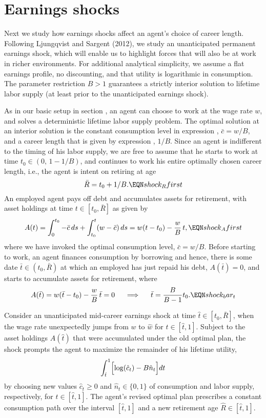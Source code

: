 \section{Earnings shocks}\label{sec:LSshocks}%
Next we study how earnings shocks affect an agent's choice of
career length. Following Ljungqvist and Sargent (2012), we
study an unanticipated permanent earnings shock, which will enable
us to highlight forces that will also be at work in richer
environments. For additional analytical simplicity, we assume a flat
earnings profile, no discounting, and that utility is logarithmic in
consumption. The parameter restriction $B>1$ guarantees a strictly
interior solution to lifetime labor supply (at least prior to
the unanticipated earnings shock).

As in our basic setup in section , an agent can
choose to work at the wage rate $w$, and solves a deterministic
lifetime labor supply problem. The optimal solution at an interior
solution is the constant consumption level in
expression , $\bar c = w / B$, and a career
length that is given by expression , $1 /B$.
Since an agent is indifferent to the timing of his labor supply,
we are free to assume that he starts to work at time
$t_0 \in (0, \,1-1/B)$,
and continues to work his entire optimally chosen
career length, i.e., the agent is intent on retiring at age
$$
\bar R = t_0 + 1/B.                              \EQN shock_Rfirst
$$
An employed agent pays off debt and accumulates assets for retirement,
with asset holdings at time $t \in [t_0, \bar R]$ as given by
$$
A(t) = \int_0^{t_0} - \bar c \, ds +
      \int_{t_0}^t (w - \bar c)\, ds
    = w (t-t_0 ) - {w  \over B} \,t,              \EQN shock_Afirst
$$
where we have invoked the optimal consumption level, $\bar c = w / B$.
Before starting to work, an agent finances consumption by
borrowing and hence, there is some date $\bar t \in (t_0, \bar R)$
at which an employed has just repaid his debt, $A(\bar t)=0$, and
starts to accumulate assets for retirement, where
$$
A(\bar t) = w (\bar t-t_0 ) - {w  \over B} \,\bar t = 0
\hskip.5cm \Longrightarrow \hskip.5cm \bar t = {B \over B-1} t_0.
                                                 \EQN shock_bar_t
$$

Consider an unanticipated mid-career earnings shock at time
$\hat t \in[t_0, \bar R]$, when the wage rate unexpectedly
jumps from $w$ to $\hat w$ for $t\in [\hat t, 1]$. Subject to
the asset holdings $A(\hat t)$ that were accumulated under the
old optimal plan, the shock prompts the agent to maximize the
remainder of his lifetime utility,
$$
\int_{\hat t}^1 \Bigl[ \log (\hat c_t) - B \hat n_t \Bigr] dt
$$
by choosing new values $\hat c_t \geq 0$ and $\hat n_t \in \{0,1\}$
of consumption and labor supply, respectively, for $t\in [\hat t, 1]$.
The agent's revised optimal plan prescribes a constant consumption
path over the interval $[\hat t, 1]$ and a new retirement
age $\hat R\in [\hat t, 1]$.

